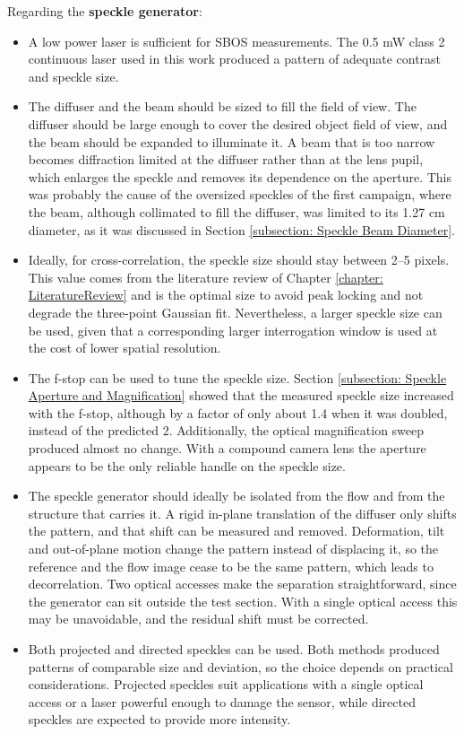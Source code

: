 Regarding the \textbf{speckle generator}:

\begin{itemize}
    \item A low power laser is sufficient for SBOS measurements. The 0.5 mW class 2 continuous laser used in this work produced a pattern of adequate contrast and speckle size.

    \item The diffuser and the beam should be sized to fill the field of view. The diffuser should be large enough to cover the desired object field of view, and the beam should be expanded to illuminate it. A beam that is too narrow becomes diffraction limited at the diffuser rather than at the lens pupil, which enlarges the speckle and removes its dependence on the aperture. This was probably the cause of the oversized speckles of the first campaign, where the beam, although collimated to fill the diffuser, was limited to its 1.27 cm diameter, as it was discussed in Section \ref{subsection: Speckle Beam Diameter}.

    \item Ideally, for cross-correlation, the speckle size should stay between 2--5 pixels. This value comes from the literature review of Chapter \ref{chapter: LiteratureReview} and is the optimal size to avoid peak locking and not degrade the three-point Gaussian fit. Nevertheless, a larger speckle size can be used, given that a corresponding larger interrogation window is used at the cost of lower spatial resolution.

    \item The f-stop can be used to tune the speckle size. Section \ref{subsection: Speckle Aperture and Magnification} showed that the measured speckle size increased with the f-stop, although by a factor of only about 1.4 when it was doubled, instead of the predicted 2. Additionally, the optical magnification sweep produced almost no change. With a compound camera lens the aperture appears to be the only reliable handle on the speckle size.

    \item The speckle generator should ideally be isolated from the flow and from the structure that carries it. A rigid in-plane translation of the diffuser only shifts the pattern, and that shift can be measured and removed. Deformation, tilt and out-of-plane motion change the pattern instead of displacing it, so the reference and the flow image cease to be the same pattern, which leads to decorrelation. Two optical accesses make the separation straightforward, since the generator can sit outside the test section. With a single optical access this may be unavoidable, and the residual shift must be corrected.

    \item Both projected and directed speckles can be used. Both methods produced patterns of comparable size and deviation, so the choice depends on practical considerations. Projected speckles suit applications with a single optical access or a laser powerful enough to damage the sensor, while directed speckles are expected to provide more intensity.

\end{itemize}

